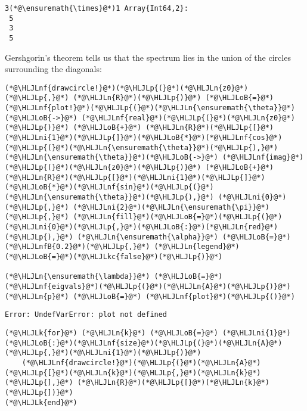\documentclass[12pt,a4paper]{article}
\newcommand{\HLJLk}[1]{\textcolor[RGB]{148,91,176}{\textbf{#1}}}
\newcommand{\HLJLkc}[1]{\textcolor[RGB]{59,151,46}{\textit{#1}}}
\newcommand{\HLJLn}[1]{#1}
\newcommand{\HLJLnf}[1]{\textcolor[RGB]{66,102,213}{#1}}
\newcommand{\HLJLnfB}[1]{\textcolor[RGB]{59,151,46}{#1}}
\newcommand{\HLJLni}[1]{\textcolor[RGB]{59,151,46}{#1}}
\newcommand{\HLJLoB}[1]{\textcolor[RGB]{102,102,102}{\textbf{#1}}}
\newcommand{\HLJLp}[1]{#1}
\begin{document}
\begin{lstlisting}
3(*@\ensuremath{\times}@*)1 Array{Int64,2}:
 5
 3
 5
\end{lstlisting}


Gershgorin's theorem tells us that the spectrum lies in the union of the circles surrounding the diagonals:


\begin{lstlisting}
(*@\HLJLnf{drawcircle!}@*)(*@\HLJLp{(}@*)(*@\HLJLn{z0}@*)(*@\HLJLp{,}@*) (*@\HLJLn{R}@*)(*@\HLJLp{)}@*) (*@\HLJLoB{=}@*) (*@\HLJLnf{plot!}@*)(*@\HLJLp{(}@*)(*@\HLJLn{\ensuremath{\theta}}@*)(*@\HLJLoB{->}@*) (*@\HLJLnf{real}@*)(*@\HLJLp{(}@*)(*@\HLJLn{z0}@*)(*@\HLJLp{)}@*) (*@\HLJLoB{+}@*) (*@\HLJLn{R}@*)(*@\HLJLp{[}@*)(*@\HLJLni{1}@*)(*@\HLJLp{]}@*)(*@\HLJLoB{*}@*)(*@\HLJLnf{cos}@*)(*@\HLJLp{(}@*)(*@\HLJLn{\ensuremath{\theta}}@*)(*@\HLJLp{),}@*) (*@\HLJLn{\ensuremath{\theta}}@*)(*@\HLJLoB{->}@*) (*@\HLJLnf{imag}@*)(*@\HLJLp{(}@*)(*@\HLJLn{z0}@*)(*@\HLJLp{)}@*) (*@\HLJLoB{+}@*) (*@\HLJLn{R}@*)(*@\HLJLp{[}@*)(*@\HLJLni{1}@*)(*@\HLJLp{]}@*)(*@\HLJLoB{*}@*)(*@\HLJLnf{sin}@*)(*@\HLJLp{(}@*)(*@\HLJLn{\ensuremath{\theta}}@*)(*@\HLJLp{),}@*) (*@\HLJLni{0}@*)(*@\HLJLp{,}@*) (*@\HLJLni{2}@*)(*@\HLJLn{\ensuremath{\pi}}@*)(*@\HLJLp{,}@*) (*@\HLJLn{fill}@*)(*@\HLJLoB{=}@*)(*@\HLJLp{(}@*)(*@\HLJLni{0}@*)(*@\HLJLp{,}@*)(*@\HLJLoB{:}@*)(*@\HLJLn{red}@*)(*@\HLJLp{),}@*) (*@\HLJLn{\ensuremath{\alpha}}@*) (*@\HLJLoB{=}@*) (*@\HLJLnfB{0.2}@*)(*@\HLJLp{,}@*) (*@\HLJLn{legend}@*)(*@\HLJLoB{=}@*)(*@\HLJLkc{false}@*)(*@\HLJLp{)}@*)

(*@\HLJLn{\ensuremath{\lambda}}@*) (*@\HLJLoB{=}@*) (*@\HLJLnf{eigvals}@*)(*@\HLJLp{(}@*)(*@\HLJLn{A}@*)(*@\HLJLp{)}@*)
(*@\HLJLn{p}@*) (*@\HLJLoB{=}@*) (*@\HLJLnf{plot}@*)(*@\HLJLp{()}@*)
\end{lstlisting}

\begin{lstlisting}
Error: UndefVarError: plot not defined
\end{lstlisting}


\begin{lstlisting}
(*@\HLJLk{for}@*) (*@\HLJLn{k}@*) (*@\HLJLoB{=}@*) (*@\HLJLni{1}@*)(*@\HLJLoB{:}@*)(*@\HLJLnf{size}@*)(*@\HLJLp{(}@*)(*@\HLJLn{A}@*)(*@\HLJLp{,}@*)(*@\HLJLni{1}@*)(*@\HLJLp{)}@*)
    (*@\HLJLnf{drawcircle!}@*)(*@\HLJLp{(}@*)(*@\HLJLn{A}@*)(*@\HLJLp{[}@*)(*@\HLJLn{k}@*)(*@\HLJLp{,}@*)(*@\HLJLn{k}@*)(*@\HLJLp{],}@*) (*@\HLJLn{R}@*)(*@\HLJLp{[}@*)(*@\HLJLn{k}@*)(*@\HLJLp{])}@*)
(*@\HLJLk{end}@*)
\end{lstlisting}
\end{document}
